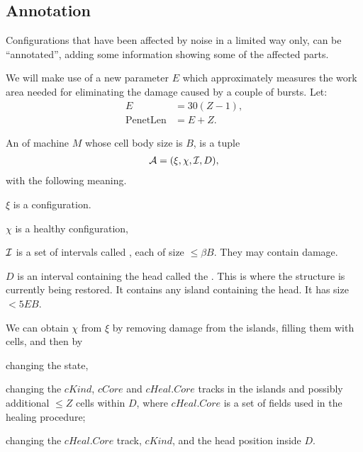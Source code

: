 \documentclass[12pt]{memoir}
\newcommand{\fld}[1]{\ensuremath{\textit{#1}}}
\def\B{B}
\newcommand{\D}{D}
\newcommand{\E}{E}
\newcommand{\PenetrationLen}{\mathrm{PenetLen}}
\newcommand{\Z}{Z}
\newcommand{\Core}{\fld{Core}}
\newcommand{\cCore}{\fld{cCore}}
\newcommand{\cKind}{\fld{cKind}}
\newcommand{\cHeal}{\fld{cHeal}}
\begin{document}
\subsection{Annotation}

Configurations that have been affected by noise in a limited way only, can be ``annotated'',
adding some information showing some of the affected parts. 


We will make use of a new parameter \( \E \) which approximately measures the work 
area needed for eliminating the damage caused by a couple of bursts.
Let:
\begin{align}\label{eq:Expansion}
   \E  &= 30(\Z-1), %
\\   \PenetrationLen &= \E+\Z.
 \end{align}


\begin{definition}\label{def:annotated-config}
    An  of machine \( M \) whose cell body size is \( \B \),
    is a tuple
         \begin{align*}
             \cA=(\xi,\chi, \cI, \D),
         \end{align*}
    with the following meaning.

    \( \xi \) is a configuration.

    \( \chi \) is a healthy configuration, %

    \( \mathcal{I} \) is a set of intervals called , each of size \( \le\beta\B \).  %
    They may contain damage.

    \( \D \) is an interval containing the head called the .
    This is where the structure is currently being restored.
    It contains any island containing the head.
    It has size \( <5\E\B \). %

    We can obtain \( \chi \) from \( \xi \) by removing damage from the islands,
    filling them with cells, and then by
    \begin{bullets}
         \item changing the state,
         \item changing the \( \cKind \), \( \cCore \)  and \( \cHeal.\Core \) tracks
               in the islands and possibly
               additional \( \le \Z \) cells within \( \D \), where
               \( \cHeal.\Core \) is a set of fields used in the healing
               procedure;
         \item changing the \( \cHeal.\Core \) track,  \( \cKind \),
           and the head position inside \( \D \).
    \end{bullets}



\end{definition}
\end{document}
